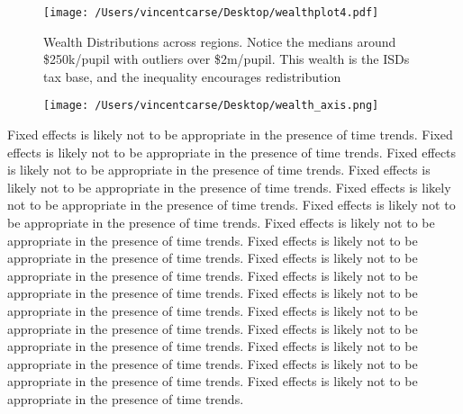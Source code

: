 \documentclass[11pt]{article}
\begin{document}
\begin{figure}
    \label{image-myimage}
    \texttt{[image: /Users/vincentcarse/Desktop/wealthplot4.pdf]}
    \caption{Wealth Distributions across regions. Notice the medians around \$250k/pupil with outliers over \$2m/pupil. This wealth is the ISDs tax base, and the inequality encourages redistribution}
\end{figure}

\begin{figure}
    \label{image-myimage}
    \texttt{[image: /Users/vincentcarse/Desktop/wealth\_axis.png]}
\end{figure}


Fixed effects is likely not to be appropriate in the presence of time trends. 
Fixed effects is likely not to be appropriate in the presence of time trends. 
Fixed effects is likely not to be appropriate in the presence of time trends. 
Fixed effects is likely not to be appropriate in the presence of time trends. 
Fixed effects is likely not to be appropriate in the presence of time trends. 
Fixed effects is likely not to be appropriate in the presence of time trends. 
Fixed effects is likely not to be appropriate in the presence of time trends. 
Fixed effects is likely not to be appropriate in the presence of time trends. 
Fixed effects is likely not to be appropriate in the presence of time trends. 
Fixed effects is likely not to be appropriate in the presence of time trends. 
Fixed effects is likely not to be appropriate in the presence of time trends. 
Fixed effects is likely not to be appropriate in the presence of time trends. 
Fixed effects is likely not to be appropriate in the presence of time trends. 
Fixed effects is likely not to be appropriate in the presence of time trends. 
Fixed effects is likely not to be appropriate in the presence of time trends. 
Fixed effects is likely not to be appropriate in the presence of time trends. 
\end{document}
